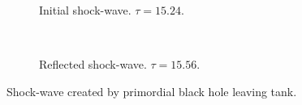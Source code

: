 \begin{figure}
\centering
\begin{subfigure}{\textwidth}

\caption{Initial shock-wave. $\tau  = 15.24$.}
\end{subfigure} \\
\begin{subfigure}{\textwidth}

\caption{Reflected shock-wave. $\tau = 15.56$.}
\end{subfigure}
\caption[Shock-wave created by primordial black hole leaving tank]{Shock-wave created by primordial black hole leaving tank.}
\label{fig:shock}
\end{figure}

%
